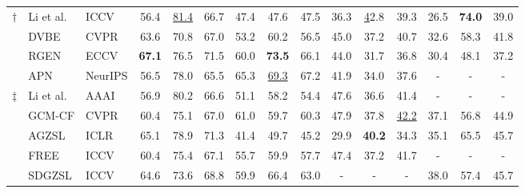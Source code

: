 \documentclass{article}
\begin{document}
\begin{table*}[t]
{\begin{tabular}{@{}cllcccccccccccc}
\multicolumn{1}{c|}{\multirow{4}{*}{$\dagger$}} 			&Li et al.               & ICCV \cite{li2019rethinking}            & 56.4          & \underline{81.4} & 66.7          & 47.4          & 47.6          & 47.5          & 36.3          & {\ul 42.8}    & 39.3          & 26.5          & \textbf{74.0}    & 39.0          \\
   \multicolumn{1}{c|}{}		&DVBE                   &CVPR \cite{xu2020attribute}    &63.6 &70.8 &67.0 &53.2 &60.2 &56.5  &45.0 &37.2 &40.7  &32.6 &58.3 &41.8\\
   \multicolumn{1}{c|}{}	&RGEN &ECCV\cite{xie2020region} &{\bf 67.1} &76.5 &71.5  &60.0 &{\bf 73.5} &66.1 &44.0 &31.7 &36.8 &30.4 &48.1 &37.2\\
	\multicolumn{1}{c|}{}		&APN                   & NeurIPS \cite{min2020domain}                       &56.5 &78.0 &65.5        & 65.3 &\underline{69.3} &67.2     &41.9 &34.0 &37.6     & -             & -             & -             \\
\midrule
\midrule
\multicolumn{1}{c|}{\multirow{9}{*}{$\ddagger$}}  	&Li et al.               & AAAI \cite{li2021generalized}            & 56.9          & 80.2    & 66.6          & 51.1          & 58.2          & 54.4          & 47.6          & 36.6          & 41.4          & -             & -             & -             \\
\multicolumn{1}{c|}{}        &GCM-CF   &CVPR \cite{yue2021counterfactual}        &60.4 &75.1 &67.0  &61.0 &59.7 &60.3    &47.9 &37.8 &\underline{42.2}   &37.1 &56.8 &44.9\\
 \multicolumn{1}{c|}{}		&AGZSL                   & ICLR \cite{chou2020adaptive}                       & 65.1          & 78.9          &71.3          & 41.4          & 49.7          &45.2         & 29.9           & {\bf 40.2}           &34.3          &35.1 &65.5 &45.7  \\
	\multicolumn{1}{c|}{}			&FREE                    & ICCV \cite{chen2021free}              & 60.4          & 75.4          & 67.1          & 55.7          & 59.9          & 57.7          & 47.4          & 37.2          & 41.7          & -             & -             & -             \\
\multicolumn{1}{c|}{}		&SDGZSL                  & ICCV \cite{chen2021semantics}        & 64.6 & 73.6 & 68.8                     & 59.9                     & 66.4                     & 63.0                     & -                        & -                        & -                        & 38.0                     & 57.4                     & 45.7                     \\

\end{tabular}}
\end{table*}
\end{document}

